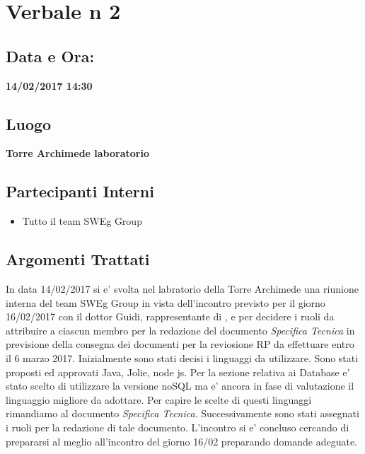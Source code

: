 \documentclass[12pt,a4paper,titlepage]{article}
\begin{document}
\section*{Verbale n 2}
\subsection*{Data e Ora:}
\begin{center}
\textbf{14/02/2017 14:30}
\subsection*{Luogo}
\textbf{Torre Archimede laboratorio}
\end{center}
\subsection*{Partecipanti Interni}
\begin{itemize}
	\item Tutto il team SWEg Group
\end{itemize}
\subsection*{Argomenti Trattati}
	In data 14/02/2017 si e' svolta nel labratorio della Torre Archimede una riunione interna del team SWEg Group in vista dell'incontro previsto per il giorno 16/02/2017 con il dottor Guidi, rappresentante di , e per decidere i ruoli da attribuire a ciascun membro per la redazione del documento \textit{Specifica Tecnica} in previsione della consegna dei documenti per la reviosione RP da effettuare entro il 6 marzo 2017. Inizialmente sono stati decisi i linguaggi da utilizzare. Sono stati proposti ed approvati Java, Jolie, node js. Per la sezione relativa ai Database e' stato scelto di utilizzare la versione noSQL ma e' ancora in fase di valutazione il linguaggio migliore da adottare. Per capire le scelte di questi linguaggi rimandiamo al documento \textit{Specifica Tecnica}. 
Successivamente sono stati assegnati i ruoli per la redazione di tale documento. 
L'incontro si e' concluso cercando di prepararsi al meglio all'incontro del giorno 16/02 preparando domande adeguate.
\end{document}
